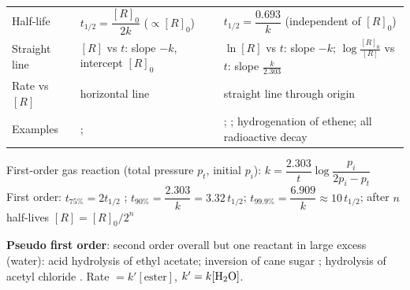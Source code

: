 \documentclass[9pt,a4paper]{extarticle}
\begin{document}
\begin{multicols}{2}
{\begin{tabularx}{\linewidth}{@{}l@{\ }Y@{\ }Y@{}}
Half-life & $t_{1/2}=\dfrac{[R]_0}{2k}$ ($\propto[R]_0$) & $t_{1/2}=\dfrac{0.693}{k}$ (independent of $[R]_0$)\\[3pt]
Straight line & $[R]$ vs $t$: slope $-k$, intercept $[R]_0$ & $\ln[R]$ vs $t$: slope $-k$;\; $\log\frac{[R]_0}{[R]}$ vs $t$: slope $\frac{k}{2.303}$\\
Rate vs $[R]$ & horizontal line & straight line through origin\\
Examples & ;  & ; ; hydrogenation of ethene; all radioactive decay\\
\bottomrule
\end{tabularx}\par}
\vspace{2pt}
\begin{kbox}
First-order gas reaction  (total pressure $p_t$, initial $p_i$): \;$k=\dfrac{2.303}{t}\log\dfrac{p_i}{2p_i-p_t}$\\[2pt]
First order: $t_{75\%}=2t_{1/2}$ \SQP;\;\; $t_{90\%}=\dfrac{2.303}{k}=3.32\,t_{1/2}$;\;\; $t_{99.9\%}=\dfrac{6.909}{k}\approx10\,t_{1/2}$;\;\; after $n$ half-lives $[R]=[R]_0/2^n$
\end{kbox}
\begin{fl}
\item \textbf{Pseudo first order}: second order overall but one reactant in large excess (water): acid hydrolysis of ethyl acetate; inversion of cane sugar ; hydrolysis of acetyl chloride \SQP. Rate $=k'[\text{ester}]$, $k'=k[\ce{H2O}]$.
\end{fl}
\noindent\begin{minipage}{\linewidth}\centering
{}\hspace{3pt}
\hspace{3pt}
\hspace{3pt}
\end{minipage}


\end{multicols}
\end{document}
